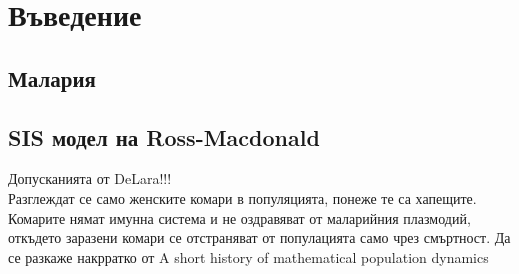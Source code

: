 \section{Въведение}
\subsection{Малария}
\subsection{SIS модел на Ross-Macdonald}
\color{Red} Допусканията от DeLara!!!
\color{Black} \\
Разглеждат се само женските комари в популяцията, понеже те са хапещите.
Комарите нямат имунна система и не оздравяват от маларийния плазмодий, откъдето заразени комари се отстраняват от популацията само чрез смъртност.
\color{Red} Да се разкаже накрратко от A short history of mathematical population dynamics
\color{Black} \\

